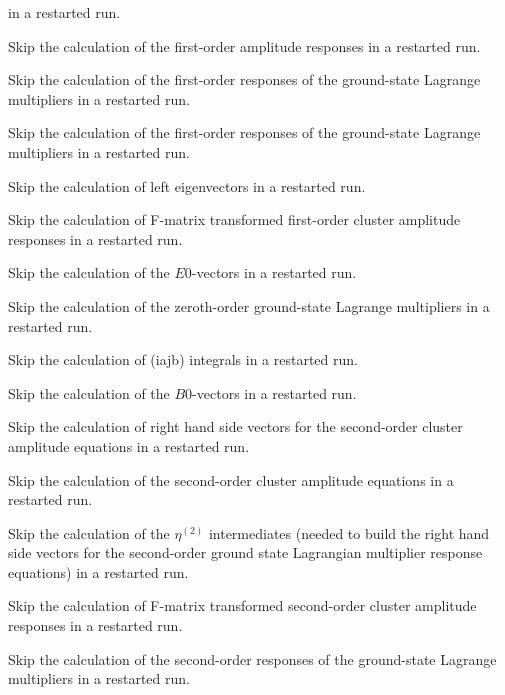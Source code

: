 \begin{description}
   in a restarted run.
%
\item[\Key{R1SKIP}] 
   Skip the calculation of the first-order amplitude responses
   in a restarted run.
%
\item[\Key{L1SKIP}] 
   Skip the calculation of the first-order responses of the 
   ground-state Lagrange multipliers in a restarted run.
%
\item[\Key{RESKIP}] 
   Skip the calculation of the first-order responses of the 
   ground-state Lagrange multipliers in a restarted run.
%
\item[\Key{LESKIP}]  
   Skip the calculation of left eigenvectors
   in a restarted run.
%
\item[\Key{F1SKIP}] 
   Skip the calculation of F-matrix transformed first-order
   cluster amplitude responses in a restarted run.
%
\item[\Key{E0SKIP}] 
   Skip the calculation of the $E0$-vectors 
   in a restarted run.
%
\item[\Key{L0SKIP}]  
   Skip the calculation of the zeroth-order ground-state Lagrange
   multipliers in a restarted run.
%
\item[\Key{LISKIP}] 
   Skip the calculation of (iajb) integrals in a restarted run.
%
\item[\Key{B0SKIP}] 
   Skip the calculation of the $B0$-vectors 
   in a restarted run.
%
\item[\Key{O2SKIP}] 
   Skip the calculation of right hand side vectors for the 
   second-order cluster amplitude equations
   in a restarted run.
%
\item[\Key{R2SKIP}] 
   Skip the calculation of the 
   second-order cluster amplitude equations
   in a restarted run.
%
\item[\Key{X2SKIP}] 
   Skip the calculation of the $\eta^{(2)}$ intermediates (needed
   to build the right hand side vectors for the second-order 
   ground state Lagrangian multiplier response equations) 
   in a restarted run.
%
\item[\Key{F2SKIP}] 
   Skip the calculation of F-matrix transformed second-order
   cluster amplitude responses in a restarted run.
%
\item[\Key{L2SKIP}]  
   Skip the calculation of the second-order responses of the 
   ground-state Lagrange multipliers in a restarted run.
\end{description}

